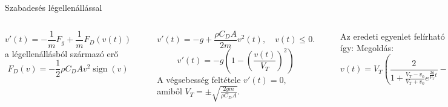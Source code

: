 \documentclass[10pt]{beamer}
\DeclareMathOperator{\sign}{sign}
\begin{document}
\begin{frame}[t]{Szabadesés légellenállással}
\begin{columns}
    \[
    v'(t) = -\frac{1}{m}F_g + \frac{1}{m}F_D(v(t))
    \]
    a légellenállásból származó erő
    \[
    F_D(v) = -\frac{1}{2}\rho C_D A v^2 \sign(v)
    \]
    \begin{center}
    \includegraphics[width=0.8\textwidth]{drag_force.pdf}
    \end{center}
    \[v'(t) = -g + \frac{\rho C_D A}{2m} v^2(t), \quad v(t)\le 0.\]
    \[v'(t) = -g\left(1-\left(\frac{v(t)}{V_T}\right)^2\right)\]
    A végsebesség feltétele $v'(t) = 0,$ amiből $V_{T} = \pm\sqrt{\frac{2 g m}{\rho C_D A}}.$
    \begin{center}
        \includegraphics[scale=0.05]{skydive.png}
    \end{center}
    Az eredeti egyenlet felírható így:
Megoldás:
\[v(t) = V_T \left(\frac{2}{ 1 + \frac{V_T - v_0}{V_T + v_0}e^{\frac{2g}{V_T}t }} - 1\right)\]
\end{columns}
\end{frame}
\end{document}
